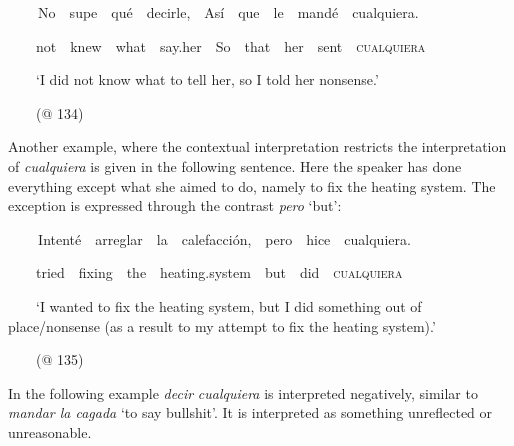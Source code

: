 \begin{styleStandard}
\textbf{\ \ }\ \ No\ \ supe\ \ qué\ \ decirle,\ \ Así\ \ que\ \ le\ \ mandé\ \ cualquiera.
\end{styleStandard}

\begin{styleStandard}
\ \ \ \ not\ \ knew\ \ what\ \ say.her\ \ So\ \ that\ \ her\ \ sent\ \ \textsc{cualquiera}
\end{styleStandard}

\begin{styleStandard}
\ \ \ \ ‘I did not know what to tell her, so I told her nonsense.’
\end{styleStandard}

\begin{styleStandard}
\ \ \ \ (@ 134)
\end{styleStandard}

\begin{styleStandard}
Another example, where the contextual interpretation restricts the interpretation of \textit{cualquiera} is given in the following sentence. Here the speaker has done everything except what she aimed to do, namely to fix the heating system. The exception is expressed through the contrast \textit{pero} ‘but’:
\end{styleStandard}

\begin{styleStandard}
\textbf{\ \ }\ \ Intenté\ \ arreglar\ \ la\ \ calefacción,\ \ pero\ \ hice\ \ cualquiera.
\end{styleStandard}

\begin{styleStandard}
\ \ \ \ tried\ \ fixing\ \ the\ \ heating.system\ \ but\ \ did\ \ \textsc{cualquiera}
\end{styleStandard}

\begin{styleStandard}
\ \ \ \ ‘I wanted to fix the heating system, but I did something out of place/nonsense (as a result to my attempt to fix the heating system).’
\end{styleStandard}

\begin{styleStandard}
\ \ \ \ (@ 135)
\end{styleStandard}

\begin{styleStandard}
In the following example \textit{decir} \textit{cualquiera} is interpreted negatively, similar to \textit{mandar la cagada} ‘to say bullshit’. It is interpreted as something unreflected or unreasonable. 
\end{styleStandard}


